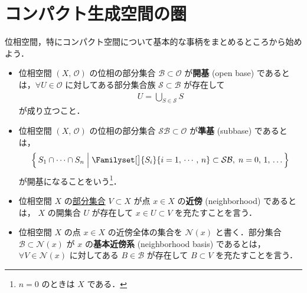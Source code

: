 \documentclass[algtopo_main]{subfiles}
\begin{document}
\setcounter{chapter}{3}

\chapter{コンパクト生成空間の圏}

位相空間，特にコンパクト空間について基本的な事柄をまとめるところから始めよう．

\begin{itemize}
    \item 位相空間 $(X,\, \mathscr{O})$ の位相の部分集合 $\mathcal{B} \subset \mathscr{O}$ が\textbf{開基} (open base) であるとは，$\forall U \in \mathscr{O}$ に対してある部分集合族 $\mathcal{S} \subset \mathcal{B}$ が存在して
    \begin{align}
        U = \bigcup_{S \in \mathcal{S}} S
    \end{align}
    が成り立つこと．
    \item 位相空間 $(X,\, \mathscr{O})$ の位相の部分集合 $\mathcal{SB} \subset \mathscr{O}$ が\textbf{準基} (subbase) であるとは，
    \begin{align}
        \Bigl\{\, S_1 \cap \cdots \cap S_n \Bigm| \Familyset[\big]{S_i}{i = 1,\, \cdots,\, n} \subset \mathcal{SB},\; n=0,\, 1,\, \dots \,\Bigr\}
    \end{align}
    が開基になることをいう\footnote{$n=0$ のときは $X$ である．}．
    \item 位相空間 $X$ の\underline{部分集合} $V \subset X$ が点 $x \in X$ の\textbf{近傍} (neighborhood) であるとは，
    $X$ の開集合 $U$ が存在して $x \in U \subset V$ を充たすことを言う．
    \item 位相空間 $X$ の点 $x \in X$ の近傍全体の集合を $\mathcal{N}(x)$ と書く．部分集合 $\mathcal{B} \subset \mathcal{N}(x)$ が $x$ の\textbf{基本近傍系} (neighborhood basis) であるとは，$\forall V \in \mathcal{N}(x)$ に対してある $B \in \mathcal{B}$ が存在して $B\subset V$ を充たすことを言う．
\end{itemize}
\end{document}
